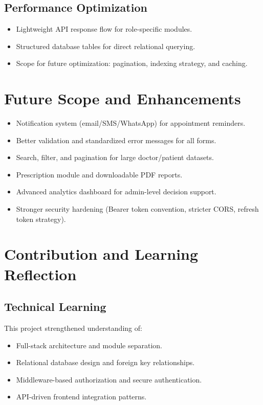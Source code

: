 \documentclass[12pt,a4paper]{article}
\begin{document}
\subsection{Performance Optimization}
\begin{itemize}[leftmargin=1.2cm]
    \item Lightweight API response flow for role-specific modules.
    \item Structured database tables for direct relational querying.
    \item Scope for future optimization: pagination, indexing strategy, and caching.
\end{itemize}

\section{Future Scope and Enhancements}
\begin{itemize}[leftmargin=1.2cm]
    \item Notification system (email/SMS/WhatsApp) for appointment reminders.
    \item Better validation and standardized error messages for all forms.
    \item Search, filter, and pagination for large doctor/patient datasets.
    \item Prescription module and downloadable PDF reports.
    \item Advanced analytics dashboard for admin-level decision support.
    \item Stronger security hardening (Bearer token convention, stricter CORS, refresh token strategy).
\end{itemize}

\section{Contribution and Learning Reflection}
\subsection{Technical Learning}
This project strengthened understanding of:
\begin{itemize}[leftmargin=1.2cm]
    \item Full-stack architecture and module separation.
    \item Relational database design and foreign key relationships.
    \item Middleware-based authorization and secure authentication.
    \item API-driven frontend integration patterns.
\end{itemize}
\end{document}
